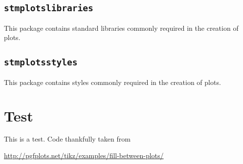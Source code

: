 \documentclass{scrartcl}
\begin{document}
\subsection{\protect\texttt{stmplotslibraries}}
\label{sec:usage:preamble:libraries}


This package contains standard libraries commonly required in the creation of plots.


\subsection{\protect\texttt{stmplotsstyles}}
\label{sec:usage:preamble:styles}


This package contains styles commonly required in the creation of plots.


\section{Test}

This is a test. Code thankfully taken from

\href{http://pgfplots.net/tikz/examples/fill-between-plots/}{http://pgfplots.net/tikz/examples/fill-between-plots/}
\end{document}
